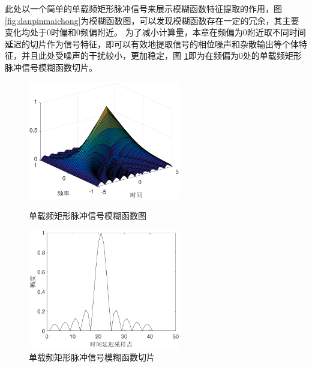 此处以一个简单的单载频矩形脉冲信号来展示模糊函数特征提取的作用，图\ref{fig:danpinmaichong}为模糊函数图，可以发现模糊函数存在一定的冗余，其主要变化均处于0时偏和0频偏附近。
为了减小计算量，本章在频偏为0附近取不同时间延迟的切片作为信号特征，即可以有效地提取信号的相位噪声和杂散输出等个体特征，并且此处受噪声的干扰较小，更加稳定，图 \ref{fig:qiepian}即为在频偏为0处的单载频矩形脉冲信号模糊函数切片。

\begin{figure}[hbt]
	\centering
	\begin{minipage}[b][][b]{7cm}
		\centering
		\includegraphics[width=6.67cm]{figures/emitter/danpinmaichong}
		\caption{单载频矩形脉冲信号模糊函数图}
		\label{fig:danpinmaichong}
	\end{minipage}
	\hspace{10pt}
	\begin{minipage}[b][][b]{7cm}
		\centering
		\includegraphics[width=6.67cm]{figures/emitter/qiepian}
		\caption{单载频矩形脉冲信号模糊函数切片}
		\label{fig:qiepian}
	\end{minipage}

\end{figure}

